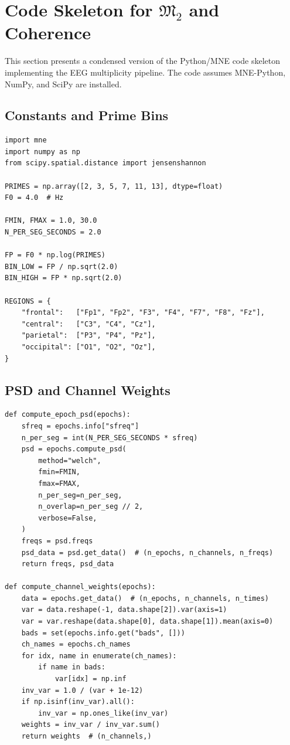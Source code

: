 \documentclass[11pt]{article}
\begin{document}
\section{Code Skeleton for \texorpdfstring{\(\mathfrak{M}_2\)}{M2} and Coherence}

This section presents a condensed version of the Python/MNE code skeleton implementing the EEG multiplicity pipeline. The code assumes MNE-Python, NumPy, and SciPy are installed.

\subsection{Constants and Prime Bins}

\begin{verbatim}
import mne
import numpy as np
from scipy.spatial.distance import jensenshannon

PRIMES = np.array([2, 3, 5, 7, 11, 13], dtype=float)
F0 = 4.0  # Hz

FMIN, FMAX = 1.0, 30.0
N_PER_SEG_SECONDS = 2.0

FP = F0 * np.log(PRIMES)
BIN_LOW = FP / np.sqrt(2.0)
BIN_HIGH = FP * np.sqrt(2.0)

REGIONS = {
    "frontal":   ["Fp1", "Fp2", "F3", "F4", "F7", "F8", "Fz"],
    "central":   ["C3", "C4", "Cz"],
    "parietal":  ["P3", "P4", "Pz"],
    "occipital": ["O1", "O2", "Oz"],
}
\end{verbatim}

\subsection{PSD and Channel Weights}

\begin{verbatim}
def compute_epoch_psd(epochs):
    sfreq = epochs.info["sfreq"]
    n_per_seg = int(N_PER_SEG_SECONDS * sfreq)
    psd = epochs.compute_psd(
        method="welch",
        fmin=FMIN,
        fmax=FMAX,
        n_per_seg=n_per_seg,
        n_overlap=n_per_seg // 2,
        verbose=False,
    )
    freqs = psd.freqs
    psd_data = psd.get_data()  # (n_epochs, n_channels, n_freqs)
    return freqs, psd_data

def compute_channel_weights(epochs):
    data = epochs.get_data()  # (n_epochs, n_channels, n_times)
    var = data.reshape(-1, data.shape[2]).var(axis=1)
    var = var.reshape(data.shape[0], data.shape[1]).mean(axis=0)
    bads = set(epochs.info.get("bads", []))
    ch_names = epochs.ch_names
    for idx, name in enumerate(ch_names):
        if name in bads:
            var[idx] = np.inf
    inv_var = 1.0 / (var + 1e-12)
    if np.isinf(inv_var).all():
        inv_var = np.ones_like(inv_var)
    weights = inv_var / inv_var.sum()
    return weights  # (n_channels,)
\end{verbatim}
\end{document}
